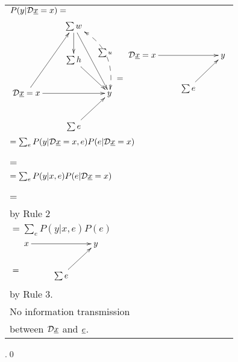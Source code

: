 \begin{longtable}{l}
\color{red}
$P(y|{\cal D}{\underline{x}}=x)=$
\\
$
\xymatrix{
&\sum w\ar[d]\ar[ddr]\ar@/^1.5pc/@{<-->}[ddr]|{\sum u}
\\
&\sum h\ar[dr]
\\
\cald\rvx=x\ar[rr]\ar[uur]
&&y
\\
&\sum e\ar[ru]
}
\xymatrix{
\\
\\
=}
\xymatrix{
\\
\cald\rvx=x\ar[rr]
&&y
\\
&\sum e\ar[ru]
}$
\\
\color{red}
$=\sum_e
P(y|{\cal D}{\underline{x}}=x, e)
P(e|{\cal D}{\underline{x}}=x)$
\\
\xymatrix{
\\=}
$
\xymatrix{
\cald\rvx=x\ar[rr]
\ar[dr]_0
&&y
\\
&\sum e\ar[ru]
}$
\\
\color{red}
$=\sum_e
P(y|x, e)
P(e|{\cal D}{\underline{x}}=x)$
\\
\xymatrix{
\\=}
$
\xymatrix{
x\ar[rrd]
\\
\cald\rvx=x
\ar[dr]_0
&&y
\\
&\sum e\ar[ru]
}$
\begin{tabular}{l}\\
by Rule 2
\end{tabular}
\\
\color{red}
$=\sum_e
P(y|x, e)
P(e)$
\\
$
\xymatrix{\\=}
\xymatrix{
x\ar[rr]
&&y
\\
&\sum e\ar[ru]
}$
\begin{tabular}{l}\\
by Rule 3.
\\ No information
transmission\\
between ${\cal D} {\underline{x}}$
and ${\underline{e}}$.
\end{tabular}
\end{longtable}
.\qed


